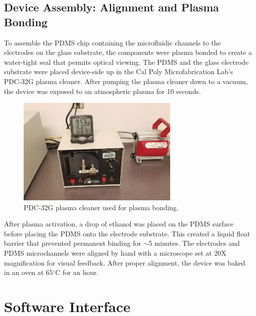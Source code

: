 \subsection{Device Assembly: Alignment and Plasma Bonding}

\par To assemble the PDMS chip containing the microfluidic channels to the electrodes on the glass substrate, the components were plasma bonded to create a water-tight seal that permits optical viewing. The PDMS and the glass electrode substrate were placed device-side up in the Cal Poly Microfabrication Lab's PDC-32G plasma cleaner. After pumping the plasma cleaner down to a vacuum, the device was exposed to an atmospheric plasma for 10 seconds.  

\begin{figure}[h]
    \centering
    \includegraphics[width=0.7\textwidth]{images/plasma_cleaner.jpg}
    \caption[PDC-32G plasma cleaner]{PDC-32G plasma cleaner used for plasma bonding.}
    \label{fig:pdc_plasma_cleaner}
\end{figure}

\par After plasma activation, a drop of ethanol was placed on the PDMS surface before placing the PDMS onto the electrode substrate. This created a liquid float barrier that prevented permanent binding for $\sim$5 minutes. The electrodes and PDMS microchannels were aligned by hand with a microscope set at 20X magnification for visual feedback. After proper alignment, the device was baked in an oven at 65$^\circ$C for an hour. 
\FloatBarrier

\section[Software]{Software Interface}

